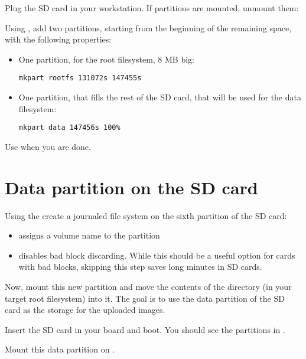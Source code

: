Plug the SD card in your workstation. If partitions are mounted,
unmount them:


Using , add two partitions, starting from the beginning
of the remaining space, with the following properties:
\begin{itemize}

\item One partition, for the root filesystem, 8 MB big:
\begin{verbatim}
mkpart rootfs 131072s 147455s
\end{verbatim}

\item One partition, that fills the rest of the SD card, that will be
  used for the data filesystem:
\begin{verbatim}
mkpart data 147456s 100%
\end{verbatim}
\end{itemize}

Use  when you are done.

\section{Data partition on the SD card}

Using the  create a journaled file system on the
sixth partition of the SD card:


\begin{itemize}
\item {} assigns a volume name to the partition
\item {} disables bad block discarding. While this
      should be a useful option for cards with bad blocks, skipping
      this step saves long minutes in SD cards.
\end{itemize}

Now, mount this new partition and move the contents of the
 directory (in your target root filesystem) into
it. The goal is to use the data partition of the SD card as the storage
for the uploaded images.

Insert the SD card in your board and boot. You should see the
partitions in .

Mount this data partition on .

